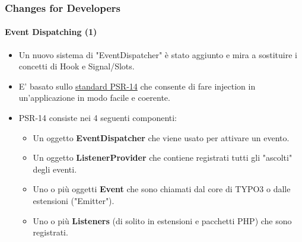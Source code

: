 \begin{frame}[fragile]
	\frametitle{Changes for Developers}
	\framesubtitle{Event Dispatching (1)}

	\begin{itemize}
		\item Un nuovo sistema di "EventDispatcher" è stato aggiunto e mira a sostituire
		    i concetti di Hook e Signal/Slots.

		\item E' basato sullo \href{https://www.php-fig.org/psr/psr-14}{standard PSR-14}
			che consente di fare injection in un'applicazione in modo facile e coerente.

		\item PSR-14 consiste nei 4 seguenti componenti:

			\begin{itemize}
				\item Un oggetto \textbf{EventDispatcher} che viene usato per attivare un evento.
				\item Un oggetto \textbf{ListenerProvider} che contiene registrati tutti gli "ascolti" degli eventi.
				\item Uno o più oggetti \textbf{Event} che sono chiamati dal core di TYPO3 o dalle estensioni ("Emitter").
				\item Uno o più \textbf{Listeners} (di solito in estensioni e pacchetti PHP) che sono registrati.
			\end{itemize}


	\end{itemize}

\end{frame}


